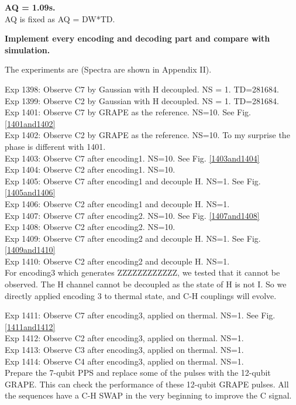 \textbf{AQ = 1.09s.}\\
AQ is fixed as AQ = DW*TD.

{}

\textbf{Implement every encoding and decoding part and compare with simulation.}

The experiments are (Spectra are shown in Appendix II).

Exp 1398: Observe C7 by Gaussian with H decoupled. NS = 1. TD=281684. \\
Exp 1399: Observe C2 by Gaussian with H decoupled. NS = 1. TD=281684. \\
Exp 1401: Observe C7 by GRAPE as the reference. NS=10. See Fig. \ref{1401and1402}\\
Exp 1402: Observe C2 by GRAPE as the reference. NS=10. To my surprise the phase is different with 1401.\\
Exp 1403: Observe C7 after encoding1. NS=10. See Fig. \ref{1403and1404}\\
Exp 1404: Observe C2 after encoding1. NS=10.\\
Exp 1405: Observe C7 after encoding1 and decouple H. NS=1. See Fig. \ref{1405and1406}\\
Exp 1406: Observe C2 after encoding1 and decouple H. NS=1.\\
Exp 1407: Observe C7 after encoding2. NS=10. See Fig. \ref{1407and1408}\\
Exp 1408: Observe C2 after encoding2. NS=10.\\
Exp 1409: Observe C7 after encoding2 and decouple H. NS=1. See Fig. \ref{1409and1410}\\
Exp 1410: Observe C2 after encoding2 and decouple H. NS=1.\\

For encoding3 which generates ZZZZZZZZZZZZ, we tested that it cannot be observed. The H channel cannot be decoupled as the state of H is not I. So we directly applied encoding 3 to thermal state, and C-H couplings will evolve.

Exp 1411: Observe C7 after encoding3, applied on thermal. NS=1. See Fig. \ref{1411and1412}\\
Exp 1412: Observe C2 after encoding3, applied on thermal. NS=1.\\
Exp 1413: Observe C3 after encoding3, applied on thermal. NS=1.\\
Exp 1414: Observe C4 after encoding3, applied on thermal. NS=1.\\

Prepare the 7-qubit PPS and replace some of the pulses with the 12-qubit GRAPE. This can check the performance of these 12-qubit GRAPE pulses. All the sequences have a C-H SWAP in the very beginning to improve the C signal.


